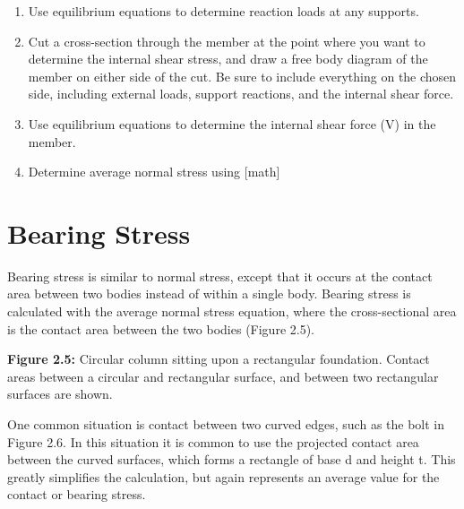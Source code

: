 \documentclass[
  letterpaper,
  DIV=11,
  numbers=noendperiod]{scrreprt}
\begin{document}
\begin{tcolorbox}[enhanced jigsaw, colbacktitle=quarto-callout-note-color!10!white, title={Step-by-step: Needs title}, coltitle=black, leftrule=.75mm, rightrule=.15mm, opacityback=0, breakable, colframe=quarto-callout-note-color-frame, left=2mm, arc=.35mm, colback=white, bottomrule=.15mm, bottomtitle=1mm, toptitle=1mm, titlerule=0mm, opacitybacktitle=0.6, toprule=.15mm]

\begin{enumerate}
\def\labelenumi{\arabic{enumi}.}
\item
  Use equilibrium equations to determine reaction loads at any supports.
\item
  Cut a cross-section through the member at the point where you want to
  determine the internal shear stress, and draw a free body diagram of
  the member on either side of the cut. Be sure to include everything on
  the chosen side, including external loads, support reactions, and the
  internal shear force.
\item
  Use equilibrium equations to determine the internal shear force (V) in
  the member.
\item
  Determine average normal stress using {[}math{]}
\end{enumerate}

\end{tcolorbox}

\section{Bearing Stress}\label{bearing-stress}

Bearing stress is similar to normal stress, except that it occurs at the
contact area between two bodies instead of within a single body. Bearing
stress is calculated with the average normal stress equation, where the
cross-sectional area is the contact area between the two bodies (Figure
2.5).

\textbf{Figure 2.5:} Circular column sitting upon a rectangular
foundation. Contact areas between a circular and rectangular surface,
and between two rectangular surfaces are shown.

One common situation is contact between two curved edges, such as the
bolt in Figure 2.6. In this situation it is common to use the projected
contact area between the curved surfaces, which forms a rectangle of
base d and height t. This greatly simplifies the calculation, but again
represents an average value for the contact or bearing stress.
\end{document}
